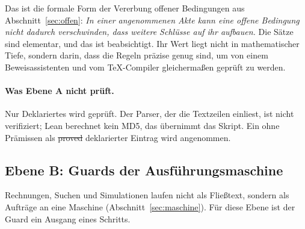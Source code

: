 Das ist die formale Form der Vererbung offener Bedingungen aus Abschnitt~\ref{sec:offen}: \emph{In einer angenommenen Akte kann eine
offene Bedingung nicht dadurch verschwinden, dass weitere Schlüsse auf ihr aufbauen.} Die Sätze sind elementar, und das ist beabsichtigt.
Ihr Wert liegt nicht in mathematischer Tiefe, sondern darin, dass die Regeln präzise genug sind, um von einem Beweisassistenten und vom
\TeX-Compiler gleichermaßen geprüft zu werden.

\paragraph{Was Ebene A nicht prüft.} Nur Deklariertes wird geprüft. Der Parser, der die Textzeilen einliest, ist nicht verifiziert; Lean
berechnet kein MD5, das übernimmt das Skript. Ein ohne Prämissen als \st{proved} deklarierter Eintrag wird angenommen.

\subsection{Ebene B: Guards der Ausführungsmaschine}\label{sec:ebeneB}

Rechnungen, Suchen und Simulationen laufen nicht als Fließtext, sondern als Aufträge an eine Maschine (Abschnitt~\ref{sec:maschine}). Für
diese Ebene ist der Guard ein Ausgang eines Schritts.

